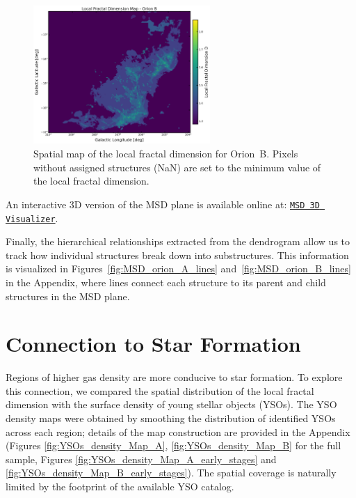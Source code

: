 \begin{figure}[t]
    \centering
    \includegraphics[width=0.6\textwidth]{figures/local_fractal_dimension_map_Orion_B.png}
    \caption{Spatial map of the local fractal dimension for Orion~B. Pixels without assigned structures (NaN) are set to the minimum value of the local fractal dimension.}
    \label{fig:local_B_map}
\end{figure}

An interactive 3D version of the MSD plane is available online at:  
\href{https://simonesped.github.io/MSD_Viz/}{\texttt{MSD 3D Visualizer}}.

Finally, the hierarchical relationships extracted from the dendrogram allow us to track how individual structures break down into substructures.  
This information is visualized in Figures~\ref{fig:MSD_orion_A_lines} and~\ref{fig:MSD_orion_B_lines} in the Appendix, where lines connect each structure to its parent and child structures in the MSD plane.

\section{Connection to Star Formation}

Regions of higher gas density are more conducive to star formation.
To explore this connection, we compared the spatial distribution of the local fractal dimension with the surface density of young stellar objects (YSOs).  
The YSO density maps were obtained by smoothing the distribution of identified YSOs across each region; details of the map construction are provided in the Appendix (Figures \ref{fig:YSOs_density_Map_A}, \ref{fig:YSOs_density_Map_B} for the full sample, Figures \ref{fig:YSOs_density_Map_A_early_stages} and \ref{fig:YSOs_density_Map_B_early_stages}).  
The spatial coverage is naturally limited by the footprint of the available YSO catalog.


